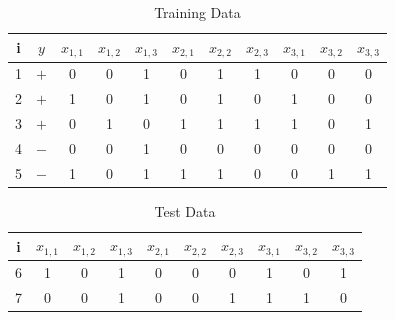 \documentclass[11pt,addpoints,answers]{exam}
\begin{document}
\begin{questions}
\begin{parts}
\begin{EnvFullwidth}
    \begin{table}[H]
        \begin{center}
        \begin{tabular}{ccccccccccc}
            \toprule
             i & $y$ & $x_{1,1}$ & $x_{1,2}$ & $x_{1,3}$ & $x_{2,1}$ & $x_{2,2}$ & $x_{2,3}$ & $x_{3,1}$ & $x_{3,2}$ & $x_{3,3}$  \\
             \midrule
             1 & $+$ & 0 & 0 & 1 & 0 & 1 & 1 & 0 & 0 & 0 \\
             2 & $+$ & 1 & 0 & 1 & 0 & 1 & 0 & 1 & 0 & 0 \\
             3 & $+$ & 0 & 1 & 0 & 1 & 1 & 1 & 1 & 0 & 1 \\
             4 & $-$ & 0 & 0 & 1 & 0 & 0 & 0 & 0 & 0 & 0 \\
             5 & $-$ & 1 & 0 & 1 & 1 & 1 & 0 & 0 & 1 & 1 \\
             \bottomrule
        \end{tabular}
        \end{center}
     \caption{Training Data}
     \label{tab:knnimages}
    \end{table}
    
    
    \begin{table}[H]
        \begin{center}
        \begin{tabular}{cccccccccc}
            \toprule
             i & $x_{1,1}$ & $x_{1,2}$ & $x_{1,3}$ & $x_{2,1}$ & $x_{2,2}$ & $x_{2,3}$ & $x_{3,1}$ & $x_{3,2}$ & $x_{3,3}$  \\
             \midrule
             6 & 1 & 0 & 1 & 0 & 0 & 0 & 1 & 0 & 1 \\
             7 & 0 & 0 & 1 & 0 & 0 & 1 & 1 & 1 & 0 \\
             \bottomrule
        \end{tabular}
        \end{center}
     \caption{Test Data}
     \label{tab:knnimages}
    \end{table}
    
    \end{EnvFullwidth}
    
    \clearpage
    
    \begin{subparts}
    

\end{subparts}
\end{parts}
\end{questions}
\end{document}
